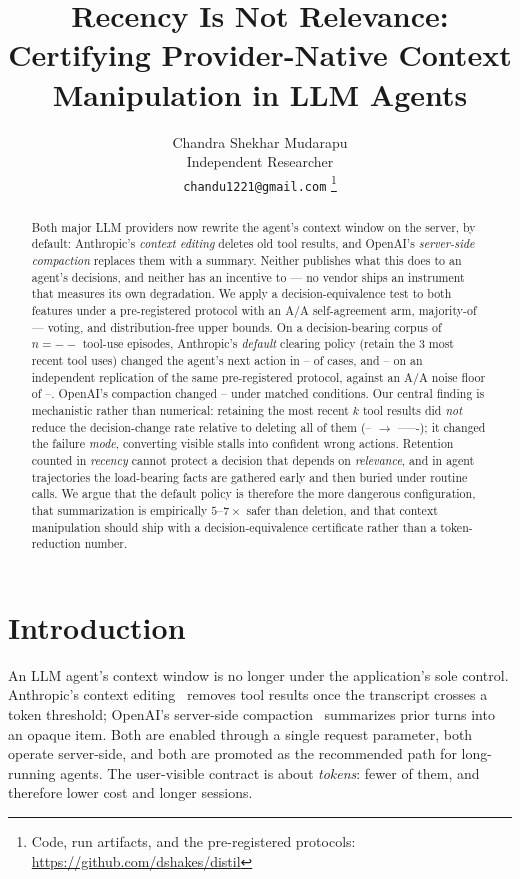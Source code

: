 \documentclass[11pt]{article}
\title{\textbf{Recency Is Not Relevance:\\
Certifying Provider-Native Context Manipulation in LLM Agents}}
\author{%
  Chandra Shekhar Mudarapu\\
  \normalsize Independent Researcher\\
  \normalsize \texttt{chandu1221@gmail.com}%
  \thanks{Code, run artifacts, and the pre-registered protocols:
  \url{https://github.com/dshakes/distil}}%
}
\date{}
\newcommand{\pcAnthropicDefaultTwoAB}{--}\newcommand{\pcAnthropicDefaultTwoAA}{--}%
\newcommand{\pcAnthropicDefaultOneAB}{--}\newcommand{\pcAnthropicDefaultOneAA}{--}%
\newcommand{\pcAnthropicAggressiveAB}{--}\newcommand{\pcAnthropicAggressiveAA}{--}%
\newcommand{\pcOpenAIThreeKAB}{--}\newcommand{\pcOpenAIThreeKAA}{--}%
\newcommand{\pcN}{--}\newcommand{\pcVotes}{--}\newcommand{\pcAlpha}{--}%
\begin{document}
\maketitle

\begin{abstract}
Both major LLM providers now rewrite the agent's context window on the server, by
default: Anthropic's \emph{context editing} deletes old tool results, and OpenAI's
\emph{server-side compaction} replaces them with a summary. Neither publishes what
this does to an agent's decisions, and neither has an incentive to --- no vendor
ships an instrument that measures its own degradation. We apply a
decision-equivalence test to both features under a pre-registered protocol with an
A/A self-agreement arm, majority-of-\pcVotes{} voting, and distribution-free upper
bounds. On a decision-bearing corpus of $n=\pcN$ tool-use episodes, Anthropic's
\emph{default} clearing policy (retain the 3 most recent tool uses) changed the
agent's next action in \pcAnthropicDefaultOneAB{} of cases, and
\pcAnthropicDefaultTwoAB{} on an independent replication of the same
pre-registered protocol, against an A/A noise floor of
\pcAnthropicDefaultOneAA{}. OpenAI's compaction changed \pcOpenAIThreeKAB{} under
matched conditions. Our central finding is mechanistic rather than numerical:
retaining the most recent $k$ tool results did \emph{not} reduce the
decision-change rate relative to deleting all of them
(\pcAnthropicAggressiveAB{} $\rightarrow$
\pcAnthropicDefaultOneAB{}--\pcAnthropicDefaultTwoAB{}); it changed the failure
\emph{mode}, converting visible stalls into confident wrong actions. Retention
counted in \emph{recency} cannot protect a decision that depends on
\emph{relevance}, and in agent trajectories the load-bearing facts are gathered
early and then buried under routine calls. We argue that the default policy is
therefore the more dangerous configuration, that summarization is empirically
$5$--$7\times$ safer than deletion, and that context manipulation should ship with
a decision-equivalence certificate rather than a token-reduction number.
\end{abstract}

\section{Introduction}
\label{sec:intro}

An LLM agent's context window is no longer under the application's sole control.
Anthropic's context editing~\cite{anthropiccontextediting} removes tool results
once the transcript crosses a token threshold; OpenAI's server-side
compaction~\cite{openaicompaction} summarizes prior turns into an opaque item. Both are enabled through a single request parameter, both operate
server-side, and both are promoted as the recommended path for long-running
agents. The user-visible contract is about \emph{tokens}: fewer of them, and
therefore lower cost and longer sessions.
\end{document}
